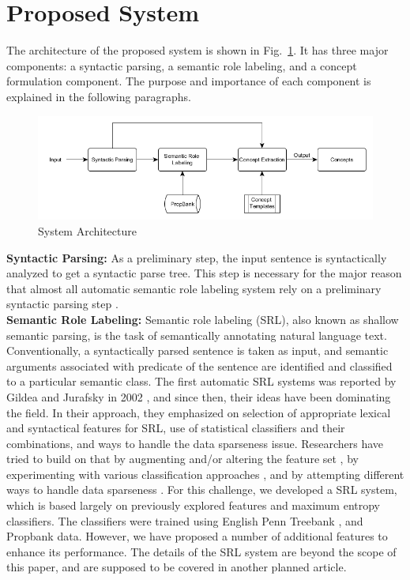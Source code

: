 \documentclass[runningheads,a4paper]{llncs}
\begin{document}
\section{Proposed System}
The architecture of the proposed system is shown in Fig.~\ref{fig:sys-archi}. It has three major components: a syntactic parsing, a semantic role labeling, and a concept formulation component. The purpose and importance of each component is explained in the following paragraphs.\\[0.3cm]
\begin{figure}[!h]
\centering
\includegraphics[width=.9\textwidth]{system-archi2.png}
\caption{System Architecture}
\label{fig:sys-archi}
\end{figure}
\textbf{Syntactic Parsing:} As a preliminary step, the input sentence is syntactically analyzed to get a syntactic parse tree. This step is necessary for the major reason that almost all automatic semantic role labeling system rely on a preliminary syntactic parsing step \cite{johansson}. \\[.3cm]
\textbf{Semantic Role Labeling:} Semantic role labeling (SRL), also known as shallow semantic parsing, is the task of semantically annotating natural language text. Conventionally, a syntactically parsed sentence is taken as input, and semantic arguments associated with predicate of the sentence are identified and classified to a particular semantic class. The first automatic SRL systems was reported by Gildea and Jurafsky in 2002 \cite{gildea}, and since then, their ideas have been dominating the field. In their approach, they emphasized on selection of appropriate lexical and syntactical features for SRL, use of statistical classifiers and their combinations, and ways to handle the data sparseness issue. Researchers have tried to build on that by augmenting and/or altering the feature set \cite{nianwen-2004}, by experimenting with various classification approaches \cite{pradan,park-2005}, and by attempting different ways to handle data sparseness \cite{zeprian}. For this challenge, we developed a SRL system, which is based largely on previously explored features and maximum entropy classifiers. The classifiers were trained using English Penn Treebank \cite{penn}, and Propbank \cite{propbank} data. However, we have proposed a number of additional features to enhance its performance. The details of the SRL system are beyond the scope of this paper, and are supposed to be covered in another planned article.  \\[0.3cm]   
\end{document}
